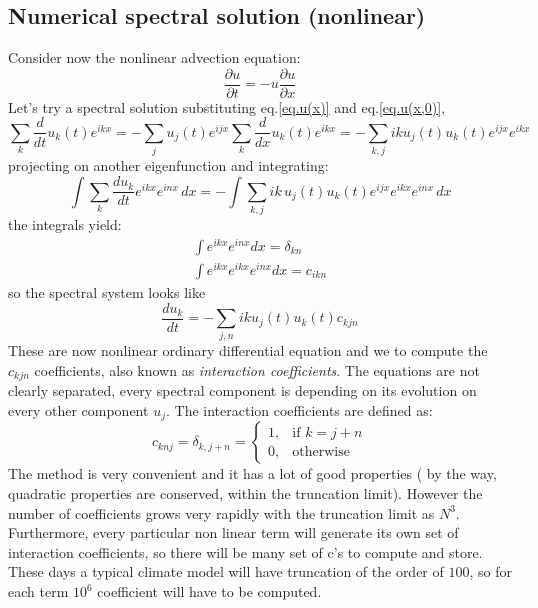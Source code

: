\subsection{Numerical spectral solution (nonlinear)}
Consider now the nonlinear advection equation:
\begin{equation}
	\frac{\partial u}{\partial t}=-u\frac{\partial u}{\partial x}
\end{equation}
Let's try a spectral solution substituting eq.\ref{eq.u(x)} and eq.\ref{eq.u(x,0)},
\[
	\sum_k \frac{d}{dt} u_k(t) e^{ikx} = -\sum_j u_j(t) e^{ijx}
	\sum_k \frac{d}{dx} u_k(t) e^{ikx} = -\sum_{k,j} ik u_j(t) u_k(t) e^{ijx} e^{ikx}
\]
projecting on another eigenfunction and integrating:
\[
	\int \sum_k \frac{du_k}{dt} e^{ikx} e^{inx} \, dx =
	- \int \sum_{k,j} ik \, u_j(t) u_k(t) e^{ijx} e^{ikx} e^{inx} \, dx
\]
the integrals yield:
\begin{align*}
	\int e^{ikx}e^{inx}dx=\delta_{kn} \\
	\int e^{ikx}e^{ikx}e^{inx}dx=c_{ikn}
\end{align*}
so the spectral system looks like
\begin{equation}\label{eq.spectral system nonlinear}
	\frac{du_k}{dt}=-\displaystyle\sum_{j,n}iku_j(t)u_k(t)c_{kjn}
\end{equation}
These are now nonlinear ordinary differential equation and we to compute the $c_{kjn}$ coefficients, also known as \textit{interaction coefficients}. The equations are not clearly separated, every spectral component is depending on its evolution on every other component $u_j$.
The interaction coefficients are defined as:
\begin{equation}
	c_{knj}=\delta_{k,j+n}=\begin{cases}
		1, & \text{if $k=j+n$} \\
		0, & \text{otherwise}
	\end{cases}
\end{equation}
The method is very convenient and it has a lot of good properties ( by the way,
quadratic properties are conserved, within the truncation limit). However the
number of coefficients grows very rapidly with the truncation limit as $N^3$.
Furthermore, every particular non linear term will generate its own set of
interaction coefficients, so there will be many set of c’s to compute and store.
These days a typical climate model will have truncation of the order of $100$, so
for each term $10^6$ coefficient will have to be computed.

